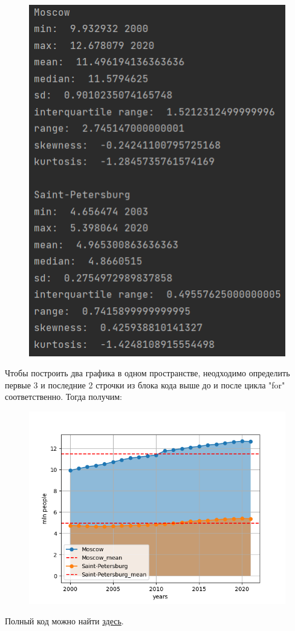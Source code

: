 \begin{figure}[H]
	\begin{center}
		\includegraphics{include/fig/describe2}
	\end{center}
\end{figure}

Чтобы построить два графика в одном пространстве, неодходимо определить первые 3 и последние 2 строчки из блока кода выше до и после цикла "for" соответственно. Тогда получим: 

\begin{figure}[H]
	\begin{center}
		\includegraphics[scale=0.8]{include/fig/moscow_spb}
	\end{center}
\end{figure}

Полный код можно найти \href{https://github.com/Sumrak1337/statistical\_processing/blob/main/docs/example\%20of\%20usage/moscow_spb_description.py}{здесь}.

\newpage

